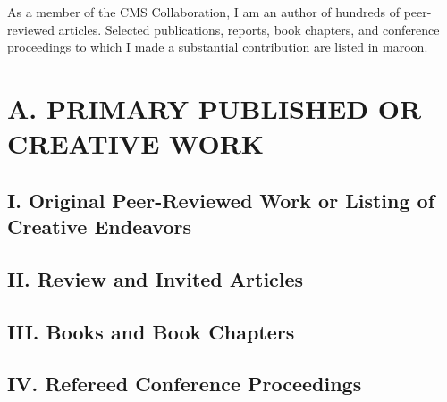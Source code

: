 \documentclass{res}
\newcommand{\MarginText}[1]{\section{#1}\vspace{10pt}}
\begin{document}

\address{}
\address{}

\newcommand{\DOI}[1]{\href{https://doi.org/#1}{doi:#1}}
\begin{resume}


  As a member of the CMS Collaboration, I am an author of hundreds of peer-reviewed articles.
  Selected publications, reports, book chapters, and conference proceedings to which I made a substantial contribution are listed in {\color{Maroon}maroon}.

  \MarginText{A. PRIMARY PUBLISHED OR CREATIVE WORK}
  \subsection{I. Original Peer-Reviewed Work or Listing of Creative Endeavors}
  \nocite{*}
  \vspace{10pt}
  \printbibliography[heading=none]

  \subsection{II. Review and Invited Articles}
  \nocite{*}
  \vspace{10pt}
  \printbibliography[heading=none]

  \subsection{III. Books and Book Chapters}
  \nocite{*}
  \vspace{10pt}
  \printbibliography[heading=none]

  \subsection{IV. Refereed Conference Proceedings}
  \nocite{*}
  \vspace{10pt}
  \printbibliography[heading=none]


\end{resume}
\end{document}

